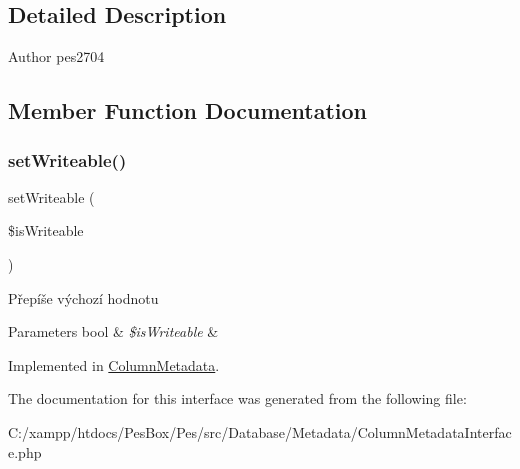 \subsection{Detailed Description}
\begin{DoxyAuthor}{Author}
pes2704 
\end{DoxyAuthor}


\subsection{Member Function Documentation}
\mbox{\label{interface_pes_1_1_database_1_1_metadata_1_1_column_metadata_interface_a0a0e7f080e4989bd257fa905bfb19c64}} 
\subsubsection{\texorpdfstring{set\+Writeable()}{setWriteable()}}
{\footnotesize\ttfamily set\+Writeable (\begin{DoxyParamCaption}\item[{}]{\$is\+Writeable }\end{DoxyParamCaption})}

Přepíše výchozí hodnotu 
\begin{DoxyParams}[1]{Parameters}
bool & {\em \$is\+Writeable} & \\
\hline
\end{DoxyParams}


Implemented in \mbox{\hyperlink{class_pes_1_1_database_1_1_metadata_1_1_column_metadata_a0a0e7f080e4989bd257fa905bfb19c64}{Column\+Metadata}}.



The documentation for this interface was generated from the following file\+:\begin{DoxyCompactItemize}
\item 
C\+:/xampp/htdocs/\+Pes\+Box/\+Pes/src/\+Database/\+Metadata/Column\+Metadata\+Interface.\+php\end{DoxyCompactItemize}
